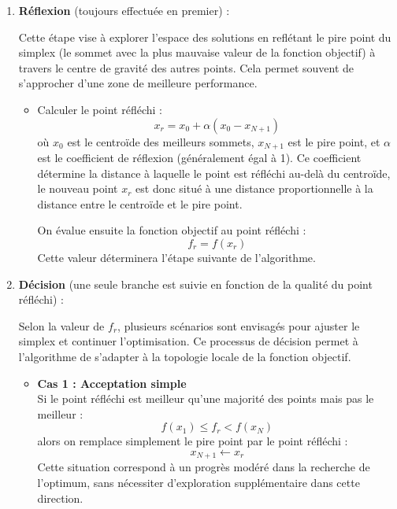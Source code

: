\begin{enumerate}
    \item \textbf{Réflexion} (toujours effectuée en premier) :
    
       Cette étape vise à explorer l'espace des solutions en reflétant le pire point du simplex (le sommet avec la plus mauvaise valeur de la fonction objectif) à travers le centre de gravité des autres points. Cela permet souvent de s'approcher d'une zone de meilleure performance.
    
       \begin{itemize}
       \item Calculer le point réfléchi :
       \begin{equation}
       x_r = x_0 + \alpha (x_0 - x_{N+1})
       \end{equation}
       où $x_0$ est le centroïde des meilleurs sommets, $x_{N+1}$ est le pire point, et $\alpha$ est le coefficient de réflexion (généralement égal à 1). Ce coefficient détermine la distance à laquelle le point est réfléchi au-delà du centroïde, le nouveau point $x_r$ est donc situé à une distance proportionnelle à la distance entre le centroïde et le pire point.
       
       On évalue ensuite la fonction objectif au point réfléchi :
       \begin{equation}
       f_r = f(x_r)
       \end{equation}
       Cette valeur déterminera l'étape suivante de l'algorithme.
       \end{itemize}
    
\vspace{1em}
    
    \item \textbf{Décision} (une seule branche est suivie en fonction de la qualité du point réfléchi) :
    
       Selon la valeur de $f_r$, plusieurs scénarios sont envisagés pour ajuster le simplex et continuer l'optimisation. Ce processus de décision permet à l'algorithme de s'adapter à la topologie locale de la fonction objectif.
    
       \begin{itemize}

\vspace{1em}

       \item \textbf{Cas 1 : Acceptation simple} \\
       Si le point réfléchi est meilleur qu'une majorité des points mais pas le meilleur :
       \begin{equation}
       f(x_1) \leq f_r < f(x_N)
       \end{equation}
       alors on remplace simplement le pire point par le point réfléchi :
       \begin{equation}
       x_{N+1} \leftarrow x_r
       \end{equation}
       Cette situation correspond à un progrès modéré dans la recherche de l'optimum, sans nécessiter d'exploration supplémentaire dans cette direction.


\end{itemize}
\end{enumerate}
